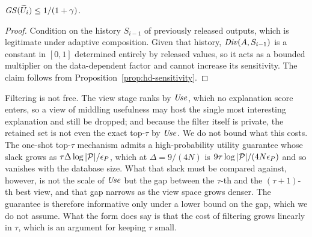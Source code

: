 \begin{proposition}
\label{prop:selection-utility-sensitivity}
$\mathit{GS}(\widetilde{U}_i)\le 1/(1+\gamma)$.
\end{proposition}

\begin{proof}
Condition on the history $S_{i-1}$ of previously released outputs, which is legitimate under adaptive composition.
Given that history, $\mathit{Div}(A,S_{i-1})$ is a constant in $[0,1]$ determined entirely by released values, so it acts as a bounded multiplier on the data-dependent factor and cannot increase its sensitivity.
The claim follows from Proposition~\ref{prop:hd-sensitivity}.
\end{proof}

Filtering is not free.
The view stage ranks by $\mathit{Use}$, which no explanation score enters, so a view of middling usefulness may host the single most interesting explanation and still be dropped; and because the filter itself is private, the retained set is not even the exact top-$\tau$ by $\mathit{Use}$.
We do not bound what this costs.
The one-shot top-$\tau$ mechanism admits a high-probability utility guarantee whose slack grows as $\tau\Delta\log|\mathcal{P}|/\epsilon_P$, which at $\Delta=9/(4N)$ is $9\tau\log|\mathcal{P}|/(4N\epsilon_P)$ and so vanishes with the database size.
What that slack must be compared against, however, is not the scale of $\mathit{Use}$ but the gap between the $\tau$-th and the $(\tau{+}1)$-th best view, and that gap narrows as the view space grows denser.
The guarantee is therefore informative only under a lower bound on the gap, which we do not assume.
What the form does say is that the cost of filtering grows linearly in $\tau$, which is an argument for keeping $\tau$ small.


